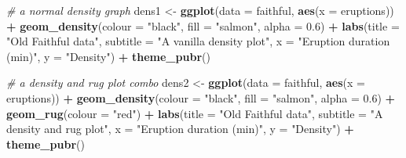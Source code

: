 \documentclass[english,10pt,a4paper,oneside]{book}
\newenvironment{Shaded}{\begin{snugshade}}{\end{snugshade}}
\newcommand{\CommentTok}[1]{\textcolor[rgb]{0.56,0.35,0.01}{\textit{#1}}}
\newcommand{\DataTypeTok}[1]{\textcolor[rgb]{0.13,0.29,0.53}{#1}}
\newcommand{\FloatTok}[1]{\textcolor[rgb]{0.00,0.00,0.81}{#1}}
\newcommand{\KeywordTok}[1]{\textcolor[rgb]{0.13,0.29,0.53}{\textbf{#1}}}
\newcommand{\NormalTok}[1]{#1}
\newcommand{\OperatorTok}[1]{\textcolor[rgb]{0.81,0.36,0.00}{\textbf{#1}}}
\newcommand{\StringTok}[1]{\textcolor[rgb]{0.31,0.60,0.02}{#1}}
\theoremstyle{definition}
\theoremstyle{definition}
\theoremstyle{definition}
\theoremstyle{remark}
\begin{document}
\begin{Shaded}
\begin{Highlighting}[]
\CommentTok{# a normal density graph}
\NormalTok{dens1 <-}\StringTok{ }\KeywordTok{ggplot}\NormalTok{(}\DataTypeTok{data =}\NormalTok{ faithful, }\KeywordTok{aes}\NormalTok{(}\DataTypeTok{x =}\NormalTok{ eruptions)) }\OperatorTok{+}
\StringTok{  }\KeywordTok{geom_density}\NormalTok{(}\DataTypeTok{colour =} \StringTok{"black"}\NormalTok{, }\DataTypeTok{fill =} \StringTok{"salmon"}\NormalTok{, }\DataTypeTok{alpha =} \FloatTok{0.6}\NormalTok{) }\OperatorTok{+}
\StringTok{  }\KeywordTok{labs}\NormalTok{(}\DataTypeTok{title =} \StringTok{"Old Faithful data"}\NormalTok{,}
       \DataTypeTok{subtitle =} \StringTok{"A vanilla density plot"}\NormalTok{,}
       \DataTypeTok{x =} \StringTok{"Eruption duration (min)"}\NormalTok{,}
       \DataTypeTok{y =} \StringTok{"Density"}\NormalTok{) }\OperatorTok{+}\StringTok{ }\KeywordTok{theme_pubr}\NormalTok{()}

\CommentTok{# a density and rug plot combo}
\NormalTok{dens2 <-}\StringTok{ }\KeywordTok{ggplot}\NormalTok{(}\DataTypeTok{data =}\NormalTok{ faithful, }\KeywordTok{aes}\NormalTok{(}\DataTypeTok{x =}\NormalTok{ eruptions)) }\OperatorTok{+}
\StringTok{  }\KeywordTok{geom_density}\NormalTok{(}\DataTypeTok{colour =} \StringTok{"black"}\NormalTok{, }\DataTypeTok{fill =} \StringTok{"salmon"}\NormalTok{, }\DataTypeTok{alpha =} \FloatTok{0.6}\NormalTok{) }\OperatorTok{+}
\StringTok{  }\KeywordTok{geom_rug}\NormalTok{(}\DataTypeTok{colour =} \StringTok{"red"}\NormalTok{) }\OperatorTok{+}
\StringTok{  }\KeywordTok{labs}\NormalTok{(}\DataTypeTok{title =} \StringTok{"Old Faithful data"}\NormalTok{,}
       \DataTypeTok{subtitle =} \StringTok{"A density and rug plot"}\NormalTok{,}
       \DataTypeTok{x =} \StringTok{"Eruption duration (min)"}\NormalTok{,}
       \DataTypeTok{y =} \StringTok{"Density"}\NormalTok{) }\OperatorTok{+}\StringTok{ }\KeywordTok{theme_pubr}\NormalTok{()}


\end{Highlighting}
\end{Shaded}
\end{document}
